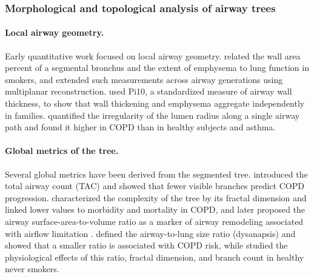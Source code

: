 \subsubsection{Morphological and topological analysis of airway trees}  %
\label{sec:related_morphology}           %

\paragraph{Local airway geometry.}       %
Early quantitative work focused on local airway
geometry. \citet{nakano2000airway} related the wall area percent of a segmental bronchus and
the extent of emphysema to lung function in smokers, and \citet{hasegawa2006airflow} extended
such measurements across airway generations using multiplanar reconstruction.
\citet{patel2008pi10} used Pi10, a standardized measure of airway wall thickness, to show that
wall thickening and emphysema aggregate independently in families. \citet{oguma2015irregularity}
quantified the irregularity of the lumen radius along a single airway path and found it
higher in COPD than in healthy subjects and asthma.

\paragraph{Global metrics of the tree.}  %
Several global metrics have been derived from the segmented tree. \citet{kirby2018tac}
introduced the total airway count (TAC) and showed that fewer visible branches predict COPD
progression. \citet{bodduluri2018afd} characterized the complexity of the tree by its fractal
dimension and linked lower values to morbidity and mortality in COPD, and later proposed the
airway surface-area-to-volume ratio as a marker of airway remodeling associated with airflow
limitation \cite{bodduluri2021sav}. \citet{smith2020dysanapsis} defined the airway-to-lung
size ratio (dysanapsis) and showed that a smaller ratio is associated with COPD risk, while
\citet{maetani2023dysanapsis} studied the physiological effects of this ratio, fractal
dimension, and branch count in healthy never smokers.

